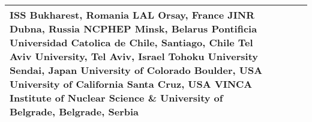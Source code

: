 \begin{landscape}
\begin{sidewaystable}
\begin{adjustbox}{max width=1.1\textwidth,totalheight=1\textheight}
\begin{tabularx}{2\textheight}{lXXXX}
ISS Bukharest, Romania  \newline
LAL Orsay, France  \newline
JINR Dubna, Russia  \newline
NCPHEP Minsk, Belarus  \newline
Pontificia Universidad Catolica de Chile, Santiago, Chile \newline
Tel Aviv University, Tel Aviv, Israel  \newline
Tohoku University Sendai, Japan  \newline
University of Colorado Boulder, USA  \newline
University of California Santa Cruz, USA  \newline
VINCA Institute of Nuclear Science \& University of Belgrade, Belgrade, Serbia  &
&
& \\
    \bottomrule
\end{tabularx}
\end{adjustbox}
\end{sidewaystable}
\end{landscape}
\restoregeometry
